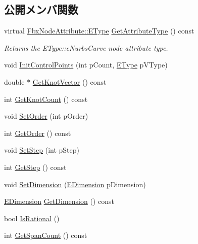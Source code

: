 \subsection*{公開メンバ関数}
\begin{DoxyCompactItemize}
\item 
virtual \hyperlink{class_fbx_node_attribute_a08e1669d3d1a696910756ab17de56d6a}{Fbx\+Node\+Attribute\+::\+E\+Type} \hyperlink{class_fbx_nurbs_curve_aa6ec087af306c42ac814d43ea80c60b3}{Get\+Attribute\+Type} () const
\begin{DoxyCompactList}\small\item\em Returns the E\+Type\+::e\+Nurbs\+Curve node attribute type. \end{DoxyCompactList}\item 
void \hyperlink{class_fbx_nurbs_curve_ac89cc4d5bf1bef1d88ee1b6e4b18be9b}{Init\+Control\+Points} (int p\+Count, \hyperlink{class_fbx_nurbs_curve_a9f232f09798b106dcc2fd5e2d8c117ed}{E\+Type} p\+V\+Type)
\item 
double $\ast$ \hyperlink{class_fbx_nurbs_curve_af90ec7ee0a8bc25834d30242afeb9e00}{Get\+Knot\+Vector} () const
\item 
int \hyperlink{class_fbx_nurbs_curve_a6201a71ed5ff2c6a5a467cc78d15c72f}{Get\+Knot\+Count} () const
\item 
void \hyperlink{class_fbx_nurbs_curve_a86494a5ca4d88af6700d0d1345852736}{Set\+Order} (int p\+Order)
\item 
int \hyperlink{class_fbx_nurbs_curve_a1cbad4f23956e5395916d45b807854f4}{Get\+Order} () const
\item 
void \hyperlink{class_fbx_nurbs_curve_ab789815bcd27978f3a4cf57bb494c7f7}{Set\+Step} (int p\+Step)
\item 
int \hyperlink{class_fbx_nurbs_curve_ac1ab9cfbac264cb9ab92dcc9b2149448}{Get\+Step} () const
\item 
void \hyperlink{class_fbx_nurbs_curve_a97134fe64a13da3a87879adf8a6c69c5}{Set\+Dimension} (\hyperlink{class_fbx_nurbs_curve_a95d4a63cff6dd62901ea39c268336122}{E\+Dimension} p\+Dimension)
\item 
\hyperlink{class_fbx_nurbs_curve_a95d4a63cff6dd62901ea39c268336122}{E\+Dimension} \hyperlink{class_fbx_nurbs_curve_a3f08d738ff4b1ca4a521fa4be2359990}{Get\+Dimension} () const
\item 
bool \hyperlink{class_fbx_nurbs_curve_a118714a2bcfd54a9e64b8cd2ed190f04}{Is\+Rational} ()
\item 
int \hyperlink{class_fbx_nurbs_curve_acb1cf2016f20b2a0c8df382046c7d3ea}{Get\+Span\+Count} () const

\end{DoxyCompactItemize}
